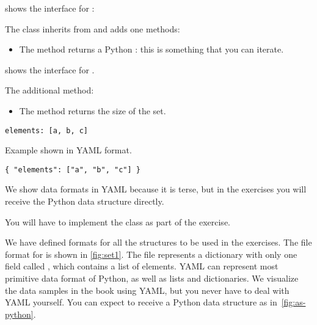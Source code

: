  shows the interface for \EnumerableSet:


The class inherits from \Setoid and adds one methods:
\begin{itemize}
    \item The method  returns a Python \Iterator: this is something that you can iterate.
\end{itemize}
 shows the interface for \FiniteSet.


The additional method:
\begin{itemize}
    \item The method  returns the size of the set.
\end{itemize}

\begin{marginfigure}
    \begin{verbatim}
elements: [a, b, c]
    \end{verbatim}
    \caption{Example shown in YAML format.}
    \label{fig:set1}
\end{marginfigure}

\begin{marginfigure}
    \begin{verbatim}
{ "elements": ["a", "b", "c"] }
    \end{verbatim}
    \caption{We show data formats in YAML because it is terse, but in the exercises you will receive the Python data structure directly.}
    \label{fig:as-python}
\end{marginfigure}

You will have to implement the \FiniteSet class as part of the exercise.


We have defined formats for all the structures to be used in the exercises.
The file format for \FiniteSet is shown in \cref{fig:set1}.
The file represents a dictionary with only one field called , which contains a list of elements.
YAML can represent most primitive data format of Python, as well as lists and dictionaries.
We visualize the data samples in the book using YAML, but you never have to deal with YAML yourself.
You can expect to receive a Python data structure as in~\cref{fig:as-python}.

